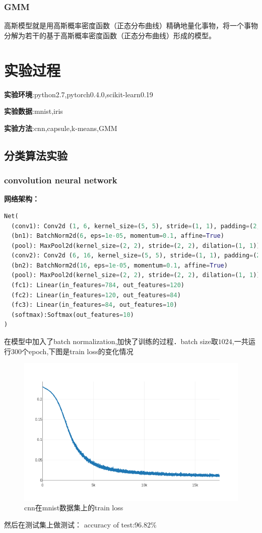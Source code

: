 \documentclass{article}
\begin{document}
	\subsubsection{GMM}
	高斯模型就是用高斯概率密度函数（正态分布曲线）精确地量化事物，将一个事物分解为若干的基于高斯概率密度函数（正态分布曲线）形成的模型。

\section{实验过程}
\textbf{实验环境}:python2.7,pytorch0.4.0\cite{pytorch},scikit-learn0.19\cite{scikit-learn}

\textbf{实验数据}:mnist,iris

\textbf{实验方法}:cnn,capsule,k-means,GMM
\subsection{分类算法实验}
\subsubsection{convolution neural network}
\textbf{网络架构：}
\begin{lstlisting}[language=python]
Net(
  (conv1): Conv2d (1, 6, kernel_size=(5, 5), stride=(1, 1), padding=(2, 2))
  (bn1): BatchNorm2d(6, eps=1e-05, momentum=0.1, affine=True)
  (pool): MaxPool2d(kernel_size=(2, 2), stride=(2, 2), dilation=(1, 1))
  (conv2): Conv2d (6, 16, kernel_size=(5, 5), stride=(1, 1), padding=(2, 2))
  (bn2): BatchNorm2d(16, eps=1e-05, momentum=0.1, affine=True)
  (pool): MaxPool2d(kernel_size=(2, 2), stride=(2, 2), dilation=(1, 1))
  (fc1): Linear(in_features=784, out_features=120)
  (fc2): Linear(in_features=120, out_features=84)
  (fc3): Linear(in_features=84, out_features=10)
  (softmax):Softmax(out_features=10)
)
\end{lstlisting}

在模型中加入了batch normalization,加快了训练的过程．batch size取$1024$,一共运行$300$个epoch,下图是train loss的变化情况

\begin{figure}[htbp]
	\centering\includegraphics[scale=0.6]{cnn_loss}
	\caption{cnn在mnist数据集上的train loss}
\end{figure}
然后在测试集上做测试：
accuracy of test:96.82\%
\end{document}
